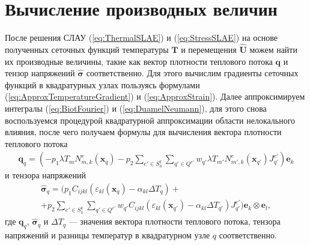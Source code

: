 \section{Вычисление производных величин}\label{sec:NumericalMethods/FluxStressCalculating}

После решения СЛАУ (\ref{eq:ThermalSLAE}) и (\ref{eq:StressSLAE}) на основе полученных сеточных функций температуры $\textbf{T}$ и перемещения $\widehat{\textbf{U}}$ можем найти их производные величины, такие как вектор плотности теплового потока $\boldsymbol{q}$ и тензор напряжений $\widehat{\boldsymbol{\sigma}}$ соответственно. Для этого вычислим градиенты сеточных функций в квадратурных узлах пользуясь формулами (\ref{eq:ApproxTemperatureGradient}) и (\ref{eq:ApproxStrain}). Далее аппроксимируем интегралы (\ref{eq:BiotFourier}) и (\ref{eq:DuamelNeumann}), для этого снова воспользуемся процедурой квадратурной аппроксимации области нелокального влияния, после чего получаем формулы для вычисления вектора плотности теплового потока
\begin{gather}
	\label{eq:ApproxFlux}
	\boldsymbol{q}_q = 
	\left(	
	-p_1 \lambda T_m N^e_{m,k} (\boldsymbol{x}_q)
	-p_2 \sum\limits_{e' \in S_h^q} \sum\limits_{q' \in Q^{e'}} w_{q'} \lambda T_{m'} N^e_{m',k} (\boldsymbol{x}_{q'}) J^{e'}_{q'}
	\right) \boldsymbol{e}_k
\end{gather}
и тензора напряжений
\begin{multline}
	\label{eq:ApproxStress}
	\widehat{\boldsymbol{\sigma}}_q =
	\Biggr(
	p_1 C_{ijkl} \left(\varepsilon_{kl} (\boldsymbol{x}_q) - \alpha_{kl} \Delta T_q \right)
	+\\+
	p_2 \sum\limits_{e' \in S_h^q} \sum\limits_{q' \in Q^{e'}} w_{q'} C_{ijkl} \left(\varepsilon_{kl} (\boldsymbol{x}_{q'}) - \alpha_{kl} \Delta T_{q'} \right) J^{e'}_{q'}
	\Biggr) \boldsymbol{e}_k \otimes \boldsymbol{e}_l,
\end{multline}
где $\boldsymbol{q}_q$, $\widehat{\boldsymbol{\sigma}}_q$ и $\Delta T_q$ --- значения вектора плотности теплового потока, тензора напряжений и разницы температур в квадратурном узле $q$ соответственно.

